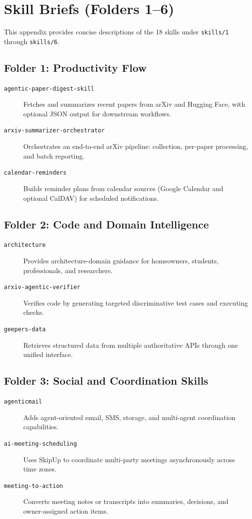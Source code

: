 \section{Skill Briefs (Folders 1--6)}
\label{app:skill-briefs}

This appendix provides concise descriptions of the 18 skills under
\texttt{skills/1} through \texttt{skills/6}.

\subsection{Folder 1: Productivity Flow}
\begin{description}
\item[\texttt{agentic-paper-digest-skill}] Fetches and summarizes recent papers from arXiv and Hugging Face, with optional JSON output for downstream workflows.
\item[\texttt{arxiv-summarizer-orchestrator}] Orchestrates an end-to-end arXiv pipeline: collection, per-paper processing, and batch reporting.
\item[\texttt{calendar-reminders}] Builds reminder plans from calendar sources (Google Calendar and optional CalDAV) for scheduled notifications.
\end{description}

\subsection{Folder 2: Code and Domain Intelligence}
\begin{description}
\item[\texttt{architecture}] Provides architecture-domain guidance for homeowners, students, professionals, and researchers.
\item[\texttt{arxiv-agentic-verifier}] Verifies code by generating targeted discriminative test cases and executing checks.
\item[\texttt{geepers-data}] Retrieves structured data from multiple authoritative APIs through one unified interface.
\end{description}

\subsection{Folder 3: Social and Coordination Skills}
\begin{description}
\item[\texttt{agenticmail}] Adds agent-oriented email, SMS, storage, and multi-agent coordination capabilities.
\item[\texttt{ai-meeting-scheduling}] Uses SkipUp to coordinate multi-party meetings asynchronously across time zones.
\item[\texttt{meeting-to-action}] Converts meeting notes or transcripts into summaries, decisions, and owner-assigned action items.
\end{description}

